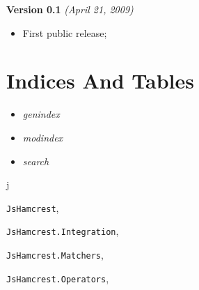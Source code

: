 \documentclass[letterpaper,10pt,english]{sphinxmanual}
\begin{document}
\textbf{Version 0.1} \emph{(April 21, 2009)}
\begin{itemize}
\item {} 
First public release;

\end{itemize}


\chapter{Indices And Tables}
\label{index:indices-and-tables}\begin{itemize}
\item {} 
\emph{genindex}

\item {} 
\emph{modindex}

\item {} 
\emph{search}

\end{itemize}


\renewcommand{\indexname}{Python Module Index}
\begin{theindex}
\def\bigletter#1{{\Large\sffamily#1}\nopagebreak\vspace{1mm}}
\bigletter{j}
\item {\texttt{JsHamcrest}}, \pageref{modules/jshamcrest:module-JsHamcrest}
\item {\texttt{JsHamcrest.Integration}}, \pageref{modules/integration:module-JsHamcrest.Integration}
\item {\texttt{JsHamcrest.Matchers}}, \pageref{modules/matchers:module-JsHamcrest.Matchers}
\item {\texttt{JsHamcrest.Operators}}, \pageref{modules/operator:module-JsHamcrest.Operators}
\end{theindex}

\renewcommand{\indexname}{Index}
\printindex
\end{document}
